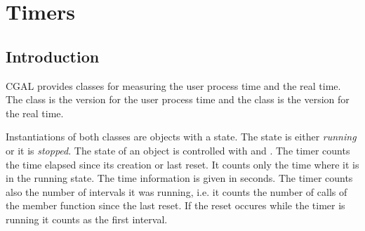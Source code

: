 
\ccParDims

\chapter{Timers}
\label{chapterTimer}

\section{Introduction}

CGAL provides classes for measuring the user process time and the real time.
The class  is the version for the user process time and
the class  is the version for the real time.

Instantiations of both classes are objects with a state. The state is
either {\em running\/} or it is {\em stopped}. The state of an object
 is controlled
with  and  . The timer counts the
time elapsed since its creation or last reset. It counts only the time
where it is in the running state. The time information is given in seconds.
The timer counts also the number of intervals it was running, i.e. it 
counts the number of calls of the  member function since the 
last reset. If the reset occures while the timer is running it counts as the
first interval.


\ccParDims

